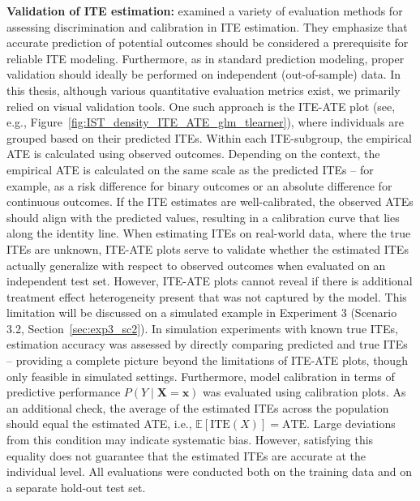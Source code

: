 \textbf{Validation of ITE estimation:} \label{sec:ite_validation} \citet{hoogland2024} examined a variety of evaluation methods for assessing discrimination and calibration in ITE estimation. They emphasize that accurate prediction of potential outcomes should be considered a prerequisite for reliable ITE modeling. Furthermore, as in standard prediction modeling, proper validation should ideally be performed on independent (out-of-sample) data.
In this thesis, although various quantitative evaluation metrics exist, we primarily relied on visual validation tools. 
One such approach is the ITE-ATE plot (see, e.g., Figure~\ref{fig:IST_density_ITE_ATE_glm_tlearner}), where individuals are grouped based on their predicted ITEs. Within each ITE-subgroup, the empirical ATE is calculated using observed outcomes. Depending on the context, the empirical ATE is calculated on the same scale as the predicted ITEs -- for example, as a risk difference for binary outcomes or an absolute difference for continuous outcomes. If the ITE estimates are well-calibrated, the observed ATEs should align with the predicted values, resulting in a calibration curve that lies along the identity line. When estimating ITEs on real-world data, where the true ITEs are unknown, ITE-ATE plots serve to validate whether the estimated ITEs actually generalize with respect to observed outcomes when evaluated on an independent test set. However, ITE-ATE plots cannot reveal if there is additional treatment effect heterogeneity present that was not captured by the model. This limitation will be discussed on a simulated example in Experiment 3 (Scenario 3.2, Section~\ref{sec:exp3_sc2}).
In simulation experiments with known true ITEs, estimation accuracy was assessed by directly comparing predicted and true ITEs -- providing a complete picture beyond the limitations of ITE-ATE plots, though only feasible in simulated settings. 
Furthermore, model calibration in terms of predictive performance $P(Y \mid \mathbf{X} = \mathbf{x})$ was evaluated using calibration plots. As an additional check, the average of the estimated ITEs across the population should equal the estimated ATE, i.e., $\mathbb{E}[\text{ITE}(X)] = \text{ATE}$. Large deviations from this condition may indicate systematic bias. However, satisfying this equality does not guarantee that the estimated ITEs are accurate at the individual level. All evaluations were conducted both on the training data and on a separate hold-out test set.

